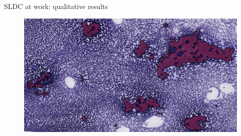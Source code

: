 \documentclass{beamer}
\begin{document}
\begin{frame}{SLDC at work: qualitative results}
\begin{figure}
		\hspace{0.25cm}
		\includegraphics[scale=0.25]{images/success_pattern_2_pat.png}
	\end{figure}
\end{frame}
\end{document}
